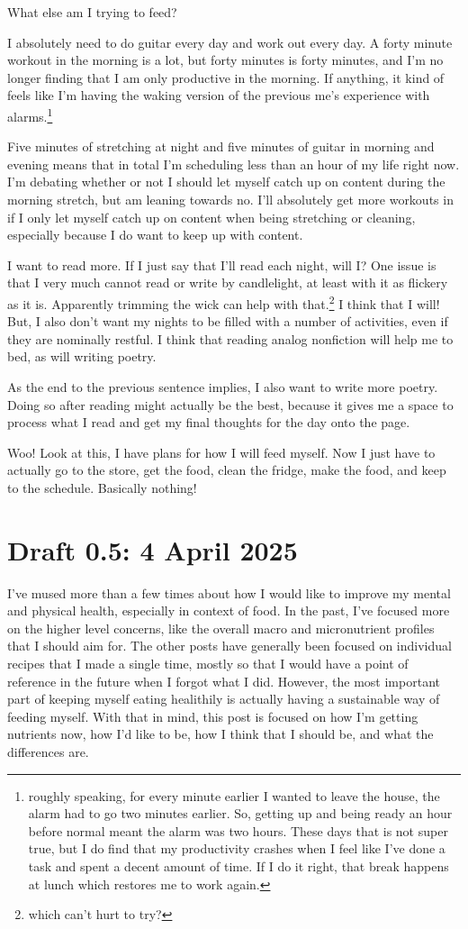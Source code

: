 \documentclass[12pt]{article}[titlepage]
\renewcommand{\,}{\textsuperscript{,}}
\begin{document}
What else am I trying to feed?

I absolutely need to do guitar every day and work out every day.  
A forty minute workout in the morning is a lot, but forty minutes is forty minutes, and I'm no longer finding that I am only productive in the morning.  
If anything, it kind of feels like I'm having the waking version of the previous me's experience with alarms.\footnote{roughly speaking, for every minute earlier I wanted to leave the house, the alarm had to go two minutes earlier. So, getting up and being ready an hour before normal meant the alarm was two hours.  
These days that is not super true, but I do find that my productivity crashes when I feel like I've done a task and spent a decent amount of time.  
If I do it right, that break happens at lunch which restores me to work again.}  
  
Five minutes of stretching at night and five minutes of guitar in morning and evening means that in total I'm scheduling less than an hour of my life right now.  
I'm debating whether or not I should let myself catch up on content during the morning stretch, but am leaning towards no.  
I'll absolutely get more workouts in if I only let myself catch up on content when being stretching or cleaning, especially because I do want to keep up with content.

I want to read more.  
If I just say that I'll read each night, will I?  
One issue is that I very much cannot read or write by candlelight, at least with it as flickery as it is.  
Apparently trimming the wick can help with that.\footnote{which can't hurt to try?}  
I think that I will!  
But, I also don't want my nights to be filled with a number of activities, even if they are nominally restful.  
I think that reading analog nonfiction will help me to bed, as will writing poetry.

As the end to the previous sentence implies, I also want to write more poetry.  
Doing so after reading might actually be the best, because it gives me a space to process what I read and get my final thoughts for the day onto the page.

Woo! Look at this, I have plans for how I will feed myself.  
Now I just have to actually go to the store, get the food, clean the fridge, make the food, and keep to the schedule.  
Basically nothing!

\section{Draft 0.5: 4 April 2025}  
I've mused more than a few times about how I would like to improve my mental and physical health, especially in context of food.  
In the past, I've focused more on the higher level concerns, like the overall macro and micronutrient profiles that I should aim for.  
The other posts have generally been focused on individual recipes that I made a single time, mostly so that I would have a point of reference in the future when I forgot what I did.  
However, the most important part of keeping myself eating healithily is actually having a sustainable way of feeding myself.  
With that in mind, this post is focused on how I'm getting nutrients now, how I'd like to be, how I think that I should be, and what the differences are.
\end{document}
